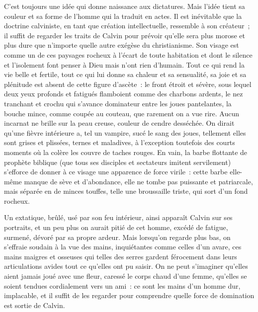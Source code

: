 \documentclass[french,twoside]{book} %
\begin{document}
\noindent C’est toujours une idée qui donne naissance aux dictatures. Mais l’idée tient sa couleur et sa forme de l’homme qui la traduit en actes. Il est inévitable que la doctrine calviniste, en tant que création intellectuelle, ressemble à son créateur ; il suffit de regarder les traits de Calvin pour prévoir qu’elle sera plus morose et plus dure que n’importe quelle autre exégèse du christianisme. Son visage est comme un de ces paysages rocheux à l’écart de toute habitation et dont le silence et l’isolement font penser à Dieu mais n’ont rien d’humain. Tout ce qui rend la vie belle et fertile, tout ce qui lui donne sa chaleur et sa sensualité, sa joie et sa plénitude est absent de cette figure d’ascète : le front étroit et sévère, sous lequel deux yeux profonds et fatigués flamboient comme des charbons ardents, le nez tranchant et crochu qui s’avance dominateur entre les joues pantelantes, la bouche mince, comme coupée au couteau, que rarement on a vue rire. Aucun incarnat ne brille sur la peau creuse, couleur de cendre desséchée. On dirait qu’une fièvre intérieure a, tel un vampire, sucé le sang des joues, tellement elles sont grises et plissées, ternes et maladives, à l’exception toutefois des courts moments où la colère les couvre de taches rouges. En vain, la barbe flottante de prophète biblique (que tous ses disciples et sectateurs imitent servilement) s’efforce de donner à ce visage une apparence de force virile : cette barbe elle-même manque de sève et d’abondance, elle ne tombe pas puissante et patriarcale, mais séparée en de minces touffes, telle une broussaille triste, qui sort d’un fond rocheux.\par
Un extatique, brûlé, usé par son feu intérieur, ainsi apparaît Calvin sur ses portraits, et un peu plus on aurait pitié de cet homme, excédé de fatigue, surmené, dévoré par sa propre ardeur. Mais lorsqu’on regarde plus bas, on s’effraie soudain à la vue des mains, inquiétantes comme celles d’un avare, ces mains maigres et osseuses qui telles des serres gardent férocement dans leurs articulations avides tout ce qu’elles ont pu saisir. On ne peut s’imaginer qu’elles aient jamais joué avec une fleur, caressé le corps chaud d’une femme, qu’elles se soient tendues cordialement vers un ami : ce sont les mains d’un homme dur, implacable, et il suffit de les regarder pour comprendre quelle force de domination est sortie de Calvin.\par
\end{document}
